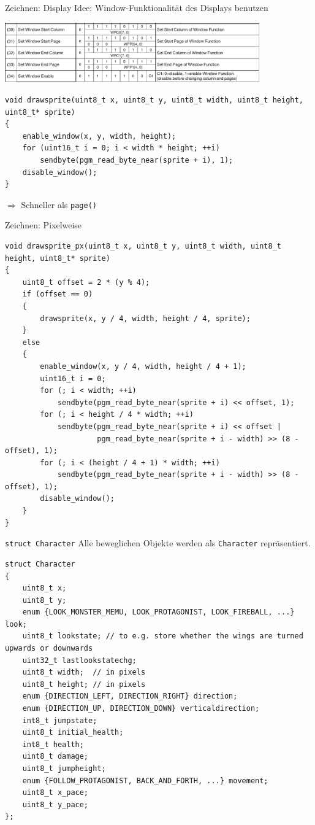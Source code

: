 \documentclass[fleqn]{beamer}
\begin{document}
    \begin{frame}[fragile]{Zeichnen: Display}
    Idee: Window-Funktionalität des Displays benutzen
    
    \includegraphics[width=11cm]{Bilder/windowcommands.png}
    
    \begin{verbatim}
void drawsprite(uint8_t x, uint8_t y, uint8_t width, uint8_t height, uint8_t* sprite)
{
    enable_window(x, y, width, height);
    for (uint16_t i = 0; i < width * height; ++i)
        sendbyte(pgm_read_byte_near(sprite + i), 1);
    disable_window();
}     
    \end{verbatim}
    $\Rightarrow$ Schneller als \texttt{page()}
    \end{frame}

    \begin{frame}[fragile]{Zeichnen: Pixelweise}
    \begin{verbatim}
void drawsprite_px(uint8_t x, uint8_t y, uint8_t width, uint8_t height, uint8_t* sprite)
{
    uint8_t offset = 2 * (y % 4);
    if (offset == 0)
    {
        drawsprite(x, y / 4, width, height / 4, sprite);
    }
    else
    {
        enable_window(x, y / 4, width, height / 4 + 1);
        uint16_t i = 0;
        for (; i < width; ++i)
            sendbyte(pgm_read_byte_near(sprite + i) << offset, 1);
        for (; i < height / 4 * width; ++i)
            sendbyte(pgm_read_byte_near(sprite + i) << offset | 
                     pgm_read_byte_near(sprite + i - width) >> (8 - offset), 1);
        for (; i < (height / 4 + 1) * width; ++i)
            sendbyte(pgm_read_byte_near(sprite + i - width) >> (8 - offset), 1);
        disable_window();
    }
}   
    \end{verbatim}
    \end{frame}

    \begin{frame}[fragile]{\texttt{struct Character}}
Alle beweglichen Objekte werden als \texttt{Character} repräsentiert.
\begin{verbatim}
struct Character
{
    uint8_t x;
    uint8_t y;
    enum {LOOK_MONSTER_MEMU, LOOK_PROTAGONIST, LOOK_FIREBALL, ...} look;
    uint8_t lookstate; // to e.g. store whether the wings are turned upwards or downwards
    uint32_t lastlookstatechg;
    uint8_t width;  // in pixels
    uint8_t height; // in pixels
    enum {DIRECTION_LEFT, DIRECTION_RIGHT} direction;
    enum {DIRECTION_UP, DIRECTION_DOWN} verticaldirection;
    int8_t jumpstate;
    uint8_t initial_health;
    int8_t health;
    uint8_t damage;
    uint8_t jumpheight;
    enum {FOLLOW_PROTAGONIST, BACK_AND_FORTH, ...} movement;
    uint8_t x_pace;
    uint8_t y_pace;
};
\end{verbatim}
\end{frame}
    
\end{document}
